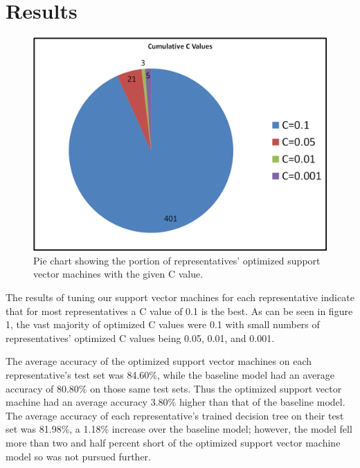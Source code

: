 \documentclass[11pt,letterpaper,twocolumn]{article}
\begin{document}
\section{Results}

\begin{figure}
\includegraphics[width=\columnwidth]{c_values.png}
\caption{Pie chart showing the portion of representatives' optimized support vector machines with the given C value.}
\end{figure}

The results of tuning our support vector machines for each representative indicate that for most representatives a C value of 0.1 is the best. As can be seen in figure 1, the vast majority of optimized C values were 0.1 with small numbers of representatives' optimized C values being 0.05, 0.01, and 0.001.

The average accuracy of the optimized support vector machines on each representative's test set was 84.60\%, while the baseline model had an average accuracy of 80.80\% on those same test sets. Thus the optimized support vector machine had an average accuracy 3.80\% higher than that of the baseline model. The average accuracy of each representative's trained decision tree on their test set was 81.98\%, a 1.18\% increase over the baseline model; however, the model fell more than two and half percent short of the optimized support vector machine model so was not pursued further.
\end{document}
